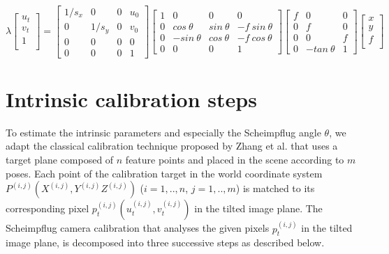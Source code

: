 \documentclass[12pt]{article}
\begin{document}
\begin{equation}  
\lambda\begin{bmatrix}
u_t\\
v_t\\
1\\
\end{bmatrix} =\begin{bmatrix}
1/s_x & 0 & 0&u_{0} \\
0 & 1/s_y & 0& v_{0} \\
0 & 0 & 0&0 \\
0& 0 & 0 & 1 
\end{bmatrix}\begin{bmatrix}
1& 0 & 0&0 \\
0 & cos~\theta & sin~\theta  & -f~sin~\theta \\
0 & -sin~\theta & cos~\theta&-f~cos~\theta\\
0 & 0 & 0 & 1
\end{bmatrix} \begin{bmatrix}
f & 0 & 0\\
0 & f & 0 \\
0 & 0 & f\\
0 & -tan~\theta & 1 
\end{bmatrix} \begin{bmatrix}
x\\
y\\
f\\
\end{bmatrix}
\label{eqn:schc}
\end{equation}





\section{Intrinsic calibration steps}

To estimate the intrinsic parameters and especially the Scheimpflug angle $\theta$, we adapt the classical  calibration technique proposed by Zhang et al. \cite{Zhang:2000:FN} that uses a target plane composed of $n$ feature points and placed in the scene according to $m$ poses.  Each point of the calibration target in the world coordinate system $P^{(i,j)} ({X}^{(i,j)}, {Y}^{(i,j)} {Z}^{(i,j)})$ ($i=1,..,n$, $j=1,..,m$) is matched to its corresponding pixel ${p}_t^{(i,j)}({u}_t^{(i,j)},{v}_t^{(i,j)})$ in the tilted image plane.  The Scheimpflug camera calibration that analyses the given pixels ${p}_t^{(i,j)}$ in the tilted image plane, is decomposed into three successive steps as described below.
\end{document}
